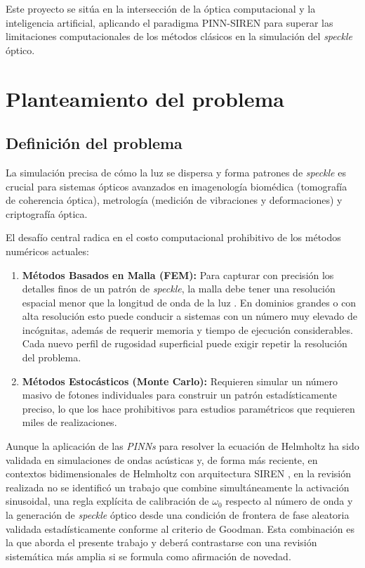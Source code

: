 Este proyecto se sitúa en la intersección de la óptica computacional y la
inteligencia artificial, aplicando el paradigma PINN-SIREN para superar las
limitaciones computacionales de los métodos clásicos en la simulación del
\textit{speckle} óptico.

\section{Planteamiento del problema}

\subsection{Definición del problema}

La simulación precisa de cómo la luz se dispersa y forma patrones de
\textit{speckle} es crucial para sistemas ópticos avanzados en imagenología
biomédica (tomografía de coherencia óptica), metrología (medición de
vibraciones y deformaciones) y criptografía óptica.

El desafío central radica en el costo computacional prohibitivo de los métodos
numéricos actuales:

\begin{enumerate}
    \item \textbf{Métodos Basados en Malla (FEM):} Para capturar con precisión
    los detalles finos de un patrón de \textit{speckle}, la malla debe tener
    una resolución espacial menor que la longitud de onda de la luz
    \parencite{jin2014finite}. En dominios grandes o con alta resolución esto
    puede conducir a sistemas con un número muy elevado de incógnitas, además de
    requerir memoria y tiempo de ejecución considerables. Cada nuevo perfil de
    rugosidad superficial puede exigir repetir la resolución del problema.

    \item \textbf{Métodos Estocásticos (Monte Carlo):} Requieren simular un
    número masivo de fotones individuales para construir un patrón estadísticamente
    preciso, lo que los hace prohibitivos para estudios paramétricos que requieren
    miles de realizaciones.
\end{enumerate}

Aunque la aplicación de las \textit{PINNs} para resolver la ecuación de
Helmholtz ha sido validada en simulaciones de ondas acústicas
\parencite{schoder2024helmholtz} y, de forma más reciente, en contextos
bidimensionales de Helmholtz con arquitectura SIREN
\parencite{panagiotakopoulos2026helmholtz}, en la revisión realizada no se
identificó un trabajo que combine simultáneamente la activación sinusoidal,
una regla explícita de calibración de $\omega_0$ respecto al número de onda y
la generación de \textit{speckle} óptico desde una condición de frontera de
fase aleatoria validada estadísticamente conforme al criterio de Goodman. Esta
combinación es la que aborda el presente trabajo y deberá contrastarse con una
revisión sistemática más amplia si se formula como afirmación de novedad.

